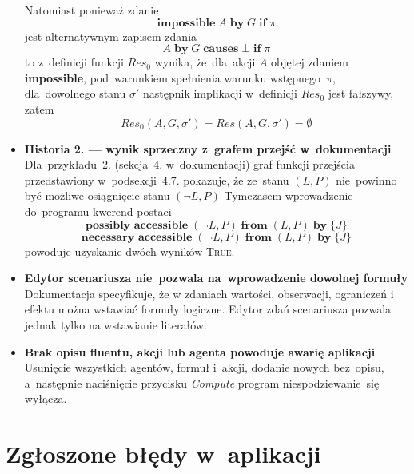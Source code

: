 \documentclass[11pt,a4paper]{article}
\begin{document}
\begin{itemize}

    Natomiast ponieważ zdanie
    $$\textbf{impossible} \; A \; \textbf{by} \; G \; \textbf{if} \; \pi$$
    jest alternatywnym zapisem zdania
    $$A \; \textbf{by} \; G \; \textbf{causes} \; \bot \; \textbf{if} \; \pi$$
    to z~definicji funkcji ${Res}_0$ wynika, że~dla~akcji $A$ objętej zdaniem \textbf{impossible}, pod~warunkiem spełnienia warunku wstępnego~$\pi$, dla~dowolnego stanu $\sigma'$ następnik implikacji w~definicji ${Res}_0$ jest fałszywy, zatem
    $${Res}_0(A,G,\sigma') = Res(A,G,\sigma') = \emptyset$$
    \item \textbf{Historia 2. --- wynik sprzeczny z~grafem przejść w~dokumentacji} \\
    Dla~przykładu~2. (sekcja~4. w~dokumentacji) graf funkcji przejścia przedstawiony w~podsekcji~4.7. pokazuje, że ze~stanu $(L, P)$ nie~powinno być możliwe osiągnięcie stanu $(\neg L, P)$ Tymczasem wprowadzenie do~programu kwerend postaci
    $$ \textbf{possibly accessible} \; (\neg L, P) \; \textbf{from} \; (L, P) \; \textbf{by} \; \{ J \} $$
    $$ \textbf{necessary accessible} \; (\neg L, P) \; \textbf{from} \; (L, P) \; \textbf{by} \; \{ J \} $$
    powoduje uzyskanie dwóch wyników \textsc{True}.
    \item \textbf{Edytor scenariusza nie~pozwala na~wprowadzenie dowolnej formuły} \\
    Dokumentacja specyfikuje, że w zdaniach wartości, obserwacji, ograniczeń i efektu można wstawiać formuły logiczne.
    Edytor zdań scenariusza pozwala jednak tylko na wstawianie literałów.
    \item \textbf{Brak opisu fluentu, akcji lub agenta powoduje awarię aplikacji} \\
    Usunięcie wszystkich agentów, formuł i~akcji, dodanie nowych bez~opisu, a~następnie naciśnięcie przycisku \emph{Compute} program niespodziewanie~się wyłącza.
\end{itemize}

\section{Zgłoszone błędy w~aplikacji}
\end{document}

